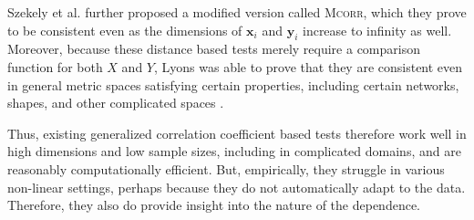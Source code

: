\documentclass[11pt]{article}
\providecommand{\sct}[1]{{\normalfont\textsc{#1}}}
\providecommand{\mb}[1]{\boldsymbol{#1}}
\newcommand{\Dcorr}{\sct{Dcorr}}
\newcommand{\Mcorr}{\sct{Mcorr}}
\newcommand{\mbx}{\ensuremath{\mb{x}}}
\newcommand{\mby}{\ensuremath{\mb{y}}}
\begin{document}
Szekely et al. \cite{SzekelyRizzo2013a} further proposed a modified version called \Mcorr, which they prove to be consistent even as the dimensions of $\mbx_i$ and $\mby_i$ increase to infinity as well.
Moreover, because these distance based tests merely require a comparison function for both $X$ and $Y$, Lyons was able to prove that they are consistent even in general metric spaces satisfying certain properties, including certain networks, shapes, and other complicated spaces  \cite{Lyons2013}.

Thus, existing generalized correlation coefficient based tests therefore work well in high dimensions and low sample sizes, including in complicated domains, and are reasonably computationally efficient. But, empirically, they struggle in various non-linear settings, perhaps because they do not automatically adapt to the data.  Therefore, they also do provide insight into the nature of the dependence.


\end{document}
